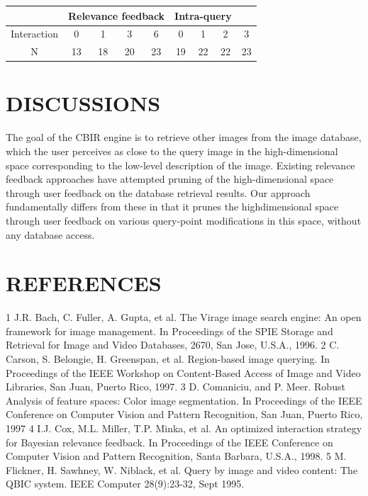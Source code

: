 \documentclass{volcanica-template}
\begin{document}
    \begin{center}
    \begin{tabular}{|c|c|c|c|c|c|c|c|c|}
            
        
        \hline
         
         &\multicolumn{4}{c}{Relevance feedback}& \multicolumn{3}{c}{Intra-query } &\\
         \hline
       Interaction & 0 &1 &3 &6 &0 &1 &2 &3 \\
       \hline
       N &13 &18 &20 &23 &19 &22 &22 &23 \\
       \hline
    \end{tabular}
    \label{tbl:1}
    \end{center}

\newpage
\newpage
{}
\section*{DISCUSSIONS}

The goal of the CBIR engine is to retrieve other images from the image database, which the user perceives as close to the query image in the high-dimensional space corresponding to the low-level description of the image. Existing relevance feedback approaches have attempted pruning of the high-dimensional space through user feedback on the database retrieval results. Our approach fundamentally differs from these in that it prunes the highdimensional space through user feedback on various query-point modifications in this space, without any database access.

\newpage
{}
\section*{REFERENCES}


1	J.R. Bach, C. Fuller, A. Gupta, et al. The Virage image search engine: An open framework for image management. In Proceedings of the SPIE Storage and Retrieval for Image and Video Databases, 2670, San Jose, U.S.A., 1996.
2	C. Carson, S. Belongie, H. Greenspan, et al. Region-based image querying. In Proceedings of the IEEE Workshop on Content-Based Access of Image and Video Libraries, San Juan, Puerto Rico, 1997.
3	D. Comaniciu, and P. Meer. Robust Analysis of feature spaces: Color image segmentation. In Proceedings of the IEEE Conference on Computer Vision and Pattern Recognition, San Juan, Puerto Rico, 1997
4	I.J. Cox, M.L. Miller, T.P. Minka, et al. An optimized interaction strategy for Bayesian relevance feedback. In Proceedings of the IEEE Conference on Computer Vision and Pattern Recognition, Santa Barbara, U.S.A., 1998.
5	M. Flickner, H. Sawhney, W. Niblack, et al. Query by image and video content: The QBIC system. IEEE Computer 28(9):23-32, Sept 1995.
\end{document}

